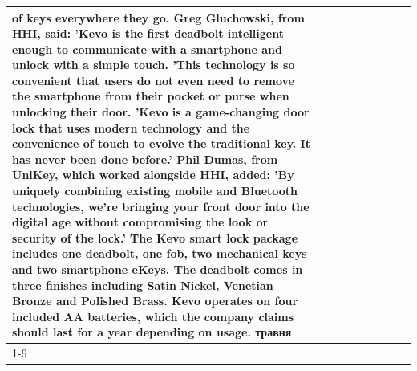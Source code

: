 \begin{table}[H]
\begin{tabular}{lllrlllll}
of keys everywhere they go. Greg Gluchowski, from HHI, said: 'Kevo is the first deadbolt intelligent enough to communicate with a smartphone and unlock with a simple touch. 'This technology is so convenient that users do not even need to remove the smartphone from their pocket or purse when unlocking their door. 'Kevo is a game-changing door lock that uses modern technology and the convenience of touch to evolve the traditional key. It has never been done before.' Phil Dumas, from UniKey, which worked alongside HHI, added: 'By uniquely combining existing mobile and Bluetooth technologies, we’re bringing your front door into the digital age without compromising the look or security of the lock.' The Kevo smart lock package includes one deadbolt, one fob, two mechanical keys and two smartphone eKeys. The deadbolt comes in three finishes including Satin Nickel, Venetian Bronze and Polished Brass. Kevo operates on four included AA batteries, which the company claims should last for a year depending on usage. травня \\
\cline{1-9}

\end{tabular}
\end{table}
